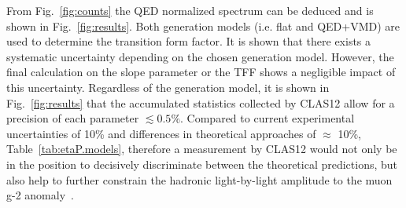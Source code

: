 \documentclass[epj]{webofc}
\begin{document}
	\FloatBarrier
From Fig.~\ref{fig:counts} the QED normalized spectrum can be deduced and is shown in Fig.~\ref{fig:results}. Both generation models (i.e. flat and QED+VMD) are used to determine the transition form factor. It is shown that there exists a systematic uncertainty depending on the chosen generation model. However, the final calculation on the slope parameter or the TFF shows a negligible impact of this uncertainty. Regardless of the generation model, it is shown in Fig.~\ref{fig:results} that the accumulated statistics collected by CLAS12 allow for a precision of each parameter $\lesssim 0.5\%$. Compared to current experimental uncertainties of 10\% and differences in theoretical approaches of $\approx$ 10\%, Table~\ref{tab:etaP.models}, therefore a measurement by CLAS12 would not only be in the position to decisively discriminate between the theoretical predictions, but also help to further constrain the hadronic light-by-light amplitude
to the muon g-2 anomaly~\cite{gminus2}.
\end{document}
